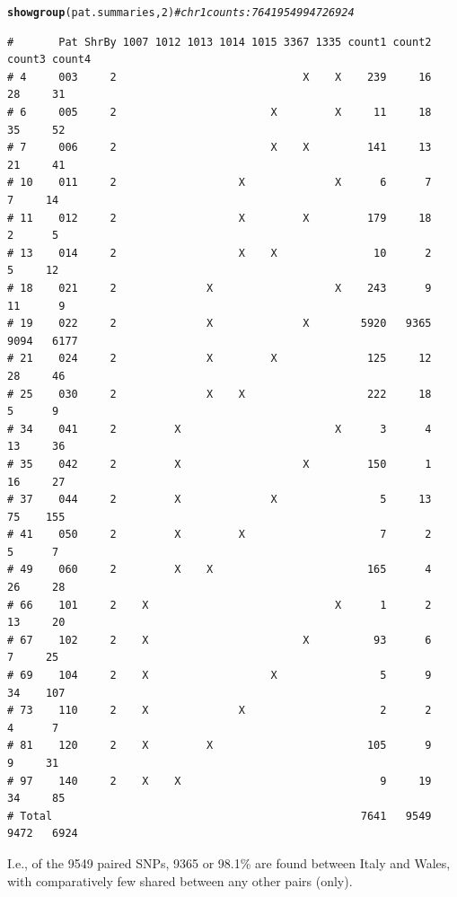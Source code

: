\documentclass{article}\usepackage[]{graphicx}\usepackage[]{color}
\makeatletter
\newcommand{\hlnum}[1]{\textcolor[rgb]{0.686,0.059,0.569}{#1}}%
\newcommand{\hlcom}[1]{\textcolor[rgb]{0.678,0.584,0.686}{\textit{#1}}}%
\newcommand{\hlstd}[1]{\textcolor[rgb]{0.345,0.345,0.345}{#1}}%
\newcommand{\hlkwd}[1]{\textcolor[rgb]{0.737,0.353,0.396}{\textbf{#1}}}%
\newenvironment{kframe}{%
 \def\at@end@of@kframe{}%
 \ifinner\ifhmode%
  \def\at@end@of@kframe{\end{minipage}}%
  \begin{minipage}{\columnwidth}%
 \fi\fi%
 \def\FrameCommand##1{\hskip\@totalleftmargin \hskip-\fboxsep
 \colorbox{shadecolor}{##1}\hskip-\fboxsep
     \hskip-\linewidth \hskip-\@totalleftmargin \hskip\columnwidth}%
 \MakeFramed {\advance\hsize-\width
   \@totalleftmargin\z@ \linewidth\hsize
   \@setminipage}}%
 {\par\unskip\endMakeFramed%
 \at@end@of@kframe}
\newenvironment{knitrout}{}{} %
\makeatother
\begin{document}
\begin{knitrout}\footnotesize
{}\color{fgcolor}\begin{kframe}
\begin{alltt}
\hlkwd{showgroup}\hlstd{(pat.summaries,}\hlnum{2}\hlstd{)} \hlcom{# chr 1 counts: 7641   9549   9472  6924}
\end{alltt}
\begin{verbatim}
#       Pat ShrBy 1007 1012 1013 1014 1015 3367 1335 count1 count2 count3 count4
# 4     003     2                             X    X    239     16     28     31
# 6     005     2                        X         X     11     18     35     52
# 7     006     2                        X    X         141     13     21     41
# 10    011     2                   X              X      6      7      7     14
# 11    012     2                   X         X         179     18      2      5
# 13    014     2                   X    X               10      2      5     12
# 18    021     2              X                   X    243      9     11      9
# 19    022     2              X              X        5920   9365   9094   6177
# 21    024     2              X         X              125     12     28     46
# 25    030     2              X    X                   222     18      5      9
# 34    041     2         X                        X      3      4     13     36
# 35    042     2         X                   X         150      1     16     27
# 37    044     2         X              X                5     13     75    155
# 41    050     2         X         X                     7      2      5      7
# 49    060     2         X    X                        165      4     26     28
# 66    101     2    X                             X      1      2     13     20
# 67    102     2    X                        X          93      6      7     25
# 69    104     2    X                   X                5      9     34    107
# 73    110     2    X              X                     2      2      4      7
# 81    120     2    X         X                        105      9      9     31
# 97    140     2    X    X                               9     19     34     85
# Total                                                7641   9549   9472   6924
\end{verbatim}
\end{kframe}
\end{knitrout}

I.e., of the 9549 paired SNPs, 9365 or
98.1\% are found between Italy
and Wales, with comparatively few shared between any other pairs (only).
\end{document}
